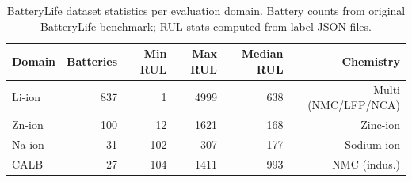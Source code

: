 \begin{table}[t]
\centering
\caption{BatteryLife dataset statistics per evaluation domain. Battery counts from original BatteryLife benchmark; RUL stats computed from label JSON files.}
\label{tab:dataset_stats_sum}
\begin{tabular*}{\tblwidth}{@{}LRRRRR@{}}
\toprule
\textbf{Domain} & \textbf{Batteries} & \textbf{Min RUL} & \textbf{Max RUL} & \textbf{Median RUL} & \textbf{Chemistry} \\
\midrule
Li-ion & 837 & 1 & 4999 & 638 & Multi (NMC/LFP/NCA) \\
Zn-ion & 100 & 12 & 1621 & 168 & Zinc-ion \\
Na-ion & 31 & 102 & 307 & 177 & Sodium-ion \\
CALB & 27 & 104 & 1411 & 993 & NMC (indus.) \\
\bottomrule
\end{tabular*}
\end{table}
